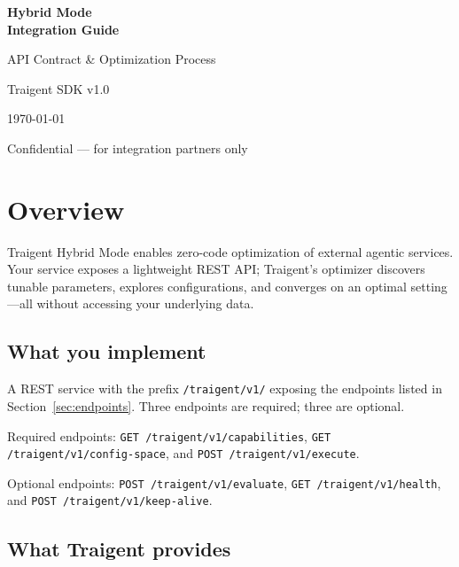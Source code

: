 \documentclass[11pt,a4paper]{article}
\begin{document}
\begin{titlepage}
\centering
\vspace*{4cm}
{\Huge\bfseries\color{traigentblue} Hybrid Mode\\[0.3em] Integration Guide\par}
\vspace{1.5cm}
{\Large API Contract \& Optimization Process\par}
\vspace{2cm}
{\large Traigent SDK v1.0\par}
\vspace{0.5cm}
{\large\today\par}
\vspace{3cm}
{\small\textcolor{black!50}{Confidential --- for integration partners only}\par}
\end{titlepage}

\tableofcontents
\clearpage

\section{Overview}

Traigent Hybrid Mode enables zero-code optimization of external agentic services.
Your service exposes a lightweight REST API; Traigent's optimizer discovers tunable
parameters, explores configurations, and converges on an optimal setting---all
without accessing your underlying data.

\subsection{What you implement}

A REST service with the prefix \texttt{/traigent/v1/} exposing the endpoints
listed in Section~\ref{sec:endpoints}. Three endpoints are required;
three are optional.

Required endpoints: \texttt{GET /traigent/v1/capabilities},
\texttt{GET /traigent/v1/config-space}, and \texttt{POST /traigent/v1/execute}.

Optional endpoints: \texttt{POST /traigent/v1/evaluate},
\texttt{GET /traigent/v1/health}, and \texttt{POST /traigent/v1/keep-alive}.

\subsection{What Traigent provides}
\end{document}
